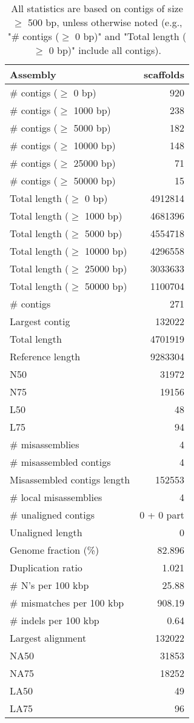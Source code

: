 \documentclass[12pt,a4paper]{article}
\begin{document}
\begin{table}[ht]
\begin{center}
\caption{All statistics are based on contigs of size $\geq$ 500 bp, unless otherwise noted (e.g., "\# contigs ($\geq$ 0 bp)" and "Total length ($\geq$ 0 bp)" include all contigs).}
\begin{tabular}{|l*{1}{|r}|}
\hline
Assembly & scaffolds \\ \hline
\# contigs ($\geq$ 0 bp) & 920 \\ \hline
\# contigs ($\geq$ 1000 bp) & 238 \\ \hline
\# contigs ($\geq$ 5000 bp) & 182 \\ \hline
\# contigs ($\geq$ 10000 bp) & 148 \\ \hline
\# contigs ($\geq$ 25000 bp) & 71 \\ \hline
\# contigs ($\geq$ 50000 bp) & 15 \\ \hline
Total length ($\geq$ 0 bp) & 4912814 \\ \hline
Total length ($\geq$ 1000 bp) & 4681396 \\ \hline
Total length ($\geq$ 5000 bp) & 4554718 \\ \hline
Total length ($\geq$ 10000 bp) & 4296558 \\ \hline
Total length ($\geq$ 25000 bp) & 3033633 \\ \hline
Total length ($\geq$ 50000 bp) & 1100704 \\ \hline
\# contigs & 271 \\ \hline
Largest contig & 132022 \\ \hline
Total length & 4701919 \\ \hline
Reference length & 9283304 \\ \hline
N50 & 31972 \\ \hline
N75 & 19156 \\ \hline
L50 & 48 \\ \hline
L75 & 94 \\ \hline
\# misassemblies & 4 \\ \hline
\# misassembled contigs & 4 \\ \hline
Misassembled contigs length & 152553 \\ \hline
\# local misassemblies & 4 \\ \hline
\# unaligned contigs & 0 + 0 part \\ \hline
Unaligned length & 0 \\ \hline
Genome fraction (\%) & 82.896 \\ \hline
Duplication ratio & 1.021 \\ \hline
\# N's per 100 kbp & 25.88 \\ \hline
\# mismatches per 100 kbp & 908.19 \\ \hline
\# indels per 100 kbp & 0.64 \\ \hline
Largest alignment & 132022 \\ \hline
NA50 & 31853 \\ \hline
NA75 & 18252 \\ \hline
LA50 & 49 \\ \hline
LA75 & 96 \\ \hline
\end{tabular}
\end{center}
\end{table}
\end{document}
